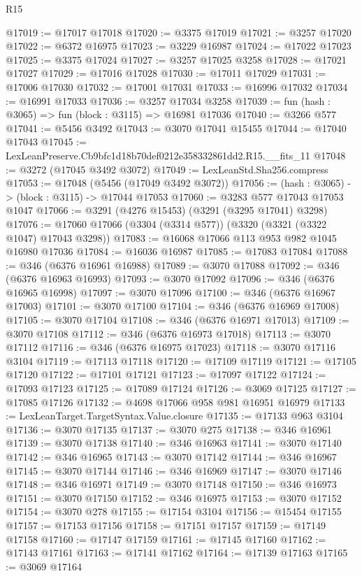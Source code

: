 \begin{lexlean}{R15}
\begin{coremodule}
@17019 := @17017 @17018
@17020 := @3375 @17019
@17021 := @3257 @17020
@17022 := @6372 @16975
@17023 := @3229 @16987
@17024 := @17022 @17023
@17025 := @3375 @17024
@17027 := @3257 @17025 @3258
@17028 := @17021 @17027
@17029 := @17016 @17028
@17030 := @17011 @17029
@17031 := @17006 @17030
@17032 := @17001 @17031
@17033 := @16996 @17032
@17034 := @16991 @17033
@17036 := @3257 @17034 @3258
@17039 := fun (hash : @3065) => fun (block : @3115) => @16981 @17036
@17040 := @3266 @577
@17041 := @5456 @3492
@17043 := @3070 @17041 @15455
@17044 := @17040 @17043
@17045 := LexLeanPreserve.Cb9bfc1d18b70def0212e358332861dd2.R15.__fits_11
@17048 := @3272 (@17045 @3492 @3072)
@17049 := LexLeanStd.Sha256.compress
@17053 := @17048 (@5456 (@17049 @3492 @3072))
@17056 := (hash : @3065) -> (block : @3115) -> @17044 @17053
@17060 := @3283 @577 @17043 @17053 @1047
@17066 := @3291 (@4276 @15453) (@3291 (@3295 @17041) @3298)
@17076 := @17060 @17066 (@3304 (@3314 @577)) (@3320 (@3321 (@3322 @1047) @17043 @3298))
@17083 := @16068 @17066 @113 @953 @982 @1045 @16980 @17036
@17084 := @16036 @16987
@17085 := @17083 @17084
@17088 := @346 (@6376 @16961 @16988)
@17089 := @3070 @17088
@17092 := @346 (@6376 @16963 @16993)
@17093 := @3070 @17092
@17096 := @346 (@6376 @16965 @16998)
@17097 := @3070 @17096
@17100 := @346 (@6376 @16967 @17003)
@17101 := @3070 @17100
@17104 := @346 (@6376 @16969 @17008)
@17105 := @3070 @17104
@17108 := @346 (@6376 @16971 @17013)
@17109 := @3070 @17108
@17112 := @346 (@6376 @16973 @17018)
@17113 := @3070 @17112
@17116 := @346 (@6376 @16975 @17023)
@17118 := @3070 @17116 @3104
@17119 := @17113 @17118
@17120 := @17109 @17119
@17121 := @17105 @17120
@17122 := @17101 @17121
@17123 := @17097 @17122
@17124 := @17093 @17123
@17125 := @17089 @17124
@17126 := @3069 @17125
@17127 := @17085 @17126
@17132 := @4698 @17066 @958 @981 @16951 @16979
@17133 := LexLeanTarget.TargetSyntax.Value.closure
@17135 := @17133 @963 @3104
@17136 := @3070 @17135
@17137 := @3070 @275
@17138 := @346 @16961
@17139 := @3070 @17138
@17140 := @346 @16963
@17141 := @3070 @17140
@17142 := @346 @16965
@17143 := @3070 @17142
@17144 := @346 @16967
@17145 := @3070 @17144
@17146 := @346 @16969
@17147 := @3070 @17146
@17148 := @346 @16971
@17149 := @3070 @17148
@17150 := @346 @16973
@17151 := @3070 @17150
@17152 := @346 @16975
@17153 := @3070 @17152
@17154 := @3070 @278
@17155 := @17154 @3104
@17156 := @15454 @17155
@17157 := @17153 @17156
@17158 := @17151 @17157
@17159 := @17149 @17158
@17160 := @17147 @17159
@17161 := @17145 @17160
@17162 := @17143 @17161
@17163 := @17141 @17162
@17164 := @17139 @17163
@17165 := @3069 @17164

\end{coremodule}
\end{lexlean}
